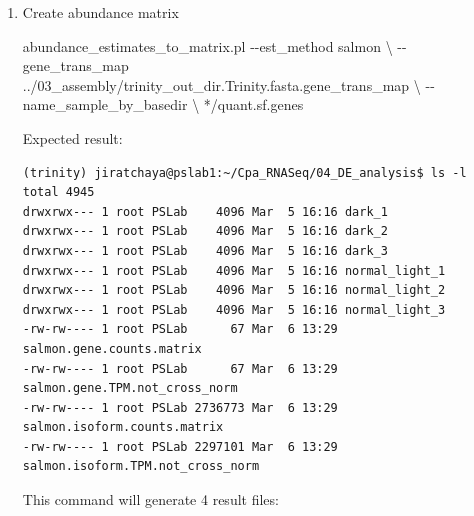 \documentclass[
  letterpaper,
  DIV=11,
  numbers=noendperiod]{scrreprt}
\newenvironment{Shaded}{\begin{snugshade}}{\end{snugshade}}
\newcommand{\AttributeTok}[1]{\textcolor[rgb]{0.40,0.45,0.13}{#1}}
\newcommand{\DataTypeTok}[1]{\textcolor[rgb]{0.68,0.00,0.00}{#1}}
\newcommand{\ExtensionTok}[1]{\textcolor[rgb]{0.00,0.23,0.31}{#1}}
\newcommand{\NormalTok}[1]{\textcolor[rgb]{0.00,0.23,0.31}{#1}}
\newcommand{\PreprocessorTok}[1]{\textcolor[rgb]{0.68,0.00,0.00}{#1}}
\begin{document}
\begin{tcolorbox}[enhanced jigsaw, breakable, bottomrule=.15mm, left=2mm, coltitle=black, opacityback=0, colframe=quarto-callout-note-color-frame, toprule=.15mm, opacitybacktitle=0.6, colbacktitle=quarto-callout-note-color!10!white, bottomtitle=1mm, colback=white, toptitle=1mm, titlerule=0mm, rightrule=.15mm, arc=.35mm, title=\textcolor{quarto-callout-note-color}{\faInfo}\hspace{0.5em}{Activity}, leftrule=.75mm]

\begin{enumerate}
\def\labelenumi{\arabic{enumi}.}
\item
  Create abundance matrix

\begin{Shaded}
\begin{Highlighting}[]
\ExtensionTok{abundance\_estimates\_to\_matrix.pl} \AttributeTok{{-}{-}est\_method}\NormalTok{ salmon }\DataTypeTok{\textbackslash{}}
\NormalTok{{-}{-}gene\_trans\_map ../03\_assembly/trinity\_out\_dir.Trinity.fasta.gene\_trans\_map }\DataTypeTok{\textbackslash{}}
\NormalTok{{-}{-}name\_sample\_by\_basedir }\DataTypeTok{\textbackslash{}}
\PreprocessorTok{*}\NormalTok{/quant.sf.genes}
\end{Highlighting}
\end{Shaded}

  Expected result:

\begin{verbatim}
(trinity) jiratchaya@pslab1:~/Cpa_RNASeq/04_DE_analysis$ ls -l
total 4945
drwxrwx--- 1 root PSLab    4096 Mar  5 16:16 dark_1
drwxrwx--- 1 root PSLab    4096 Mar  5 16:16 dark_2
drwxrwx--- 1 root PSLab    4096 Mar  5 16:16 dark_3
drwxrwx--- 1 root PSLab    4096 Mar  5 16:16 normal_light_1
drwxrwx--- 1 root PSLab    4096 Mar  5 16:16 normal_light_2
drwxrwx--- 1 root PSLab    4096 Mar  5 16:16 normal_light_3
-rw-rw---- 1 root PSLab      67 Mar  6 13:29 salmon.gene.counts.matrix
-rw-rw---- 1 root PSLab      67 Mar  6 13:29 salmon.gene.TPM.not_cross_norm
-rw-rw---- 1 root PSLab 2736773 Mar  6 13:29 salmon.isoform.counts.matrix
-rw-rw---- 1 root PSLab 2297101 Mar  6 13:29 salmon.isoform.TPM.not_cross_norm
\end{verbatim}

  This command will generate 4 result files:


\end{enumerate}
\end{tcolorbox}
\end{document}
